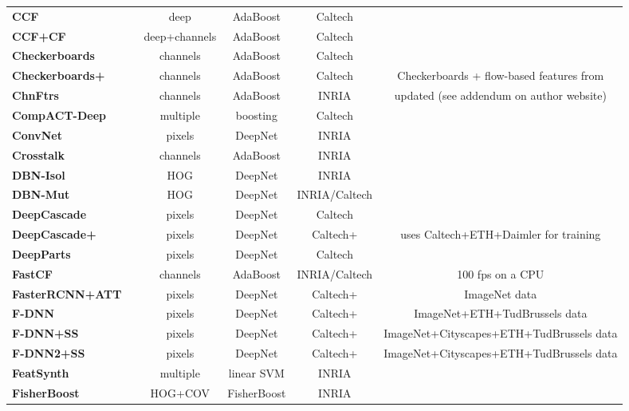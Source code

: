 \documentclass[onecolumn]{article}
\begin{document}
\begin{table}[!h]
\begin{tabular}{@{}l@{\cp}c|c@{\cp}c@{\cp}c|c@{}}
  \textbf{CCF} & \cite{YangICCV15} & deep & AdaBoost & Caltech & \\
  \textbf{CCF+CF} & \cite{YangICCV15} & deep+channels & AdaBoost & Caltech \\
  \textbf{Checkerboards} & \cite{ZhangCVPR15} & channels & AdaBoost & Caltech & \\
  \textbf{Checkerboards+} & \cite{ZhangCVPR15} & channels & AdaBoost & Caltech &
   Checkerboards + flow-based features from \cite{ParkCVPR13} \\
  \textbf{ChnFtrs} & \cite{DollarBMVC09} & channels & AdaBoost & INRIA &
   updated (see addendum on author website) \\
  \textbf{CompACT-Deep} & \cite{CaiICCV15} & multiple & boosting & Caltech & \\
  \textbf{ConvNet} & \cite{SermanetCVPR13} & pixels & DeepNet & INRIA & \\
  \textbf{Crosstalk} & \cite{DollarECCV12} & channels & AdaBoost & INRIA & \\
  \textbf{DBN-Isol} & \cite{OuyangCVPR12} & HOG & DeepNet & INRIA & \\
  \textbf{DBN-Mut} & \cite{OuyangCVPR13b} & HOG & DeepNet & INRIA/Caltech & \\
  \textbf{DeepCascade} & \cite{AngelovaBMVC15} & pixels & DeepNet & Caltech & \\
  \textbf{DeepCascade+} & \cite{AngelovaBMVC15} & pixels & DeepNet & Caltech+ & 
   uses Caltech+ETH+Daimler for training\\
  \textbf{DeepParts} & \cite{TianICCV2015} & pixels & DeepNet & Caltech & \\
  \textbf{FastCF} & \cite{CosteaITSC15} & channels & AdaBoost & INRIA/Caltech &
   100 fps on a CPU \\
  \textbf{FasterRCNN+ATT} & \cite{ZhangCVPR18} & pixels & DeepNet & Caltech+ &
   ImageNet data \\
  \textbf{F-DNN} & \cite{DuArXiv16} & pixels & DeepNet & Caltech+ &
   ImageNet+ETH+TudBrussels data\\
  \textbf{F-DNN+SS} & \cite{DuArXiv16} & pixels & DeepNet & Caltech+ &
   ImageNet+Cityscapes+ETH+TudBrussels data\\
  \textbf{F-DNN2+SS} & \cite{DuArXiv18} & pixels & DeepNet & Caltech+ &
   ImageNet+Cityscapes+ETH+TudBrussels data\\
  \textbf{FeatSynth} & \cite{BarHillelECCV10} & multiple & linear SVM & INRIA & \\
  \textbf{FisherBoost} & \cite{ShenIJCV13} & HOG+COV & FisherBoost & INRIA & \\

\end{tabular}
\end{table}
\end{document}
